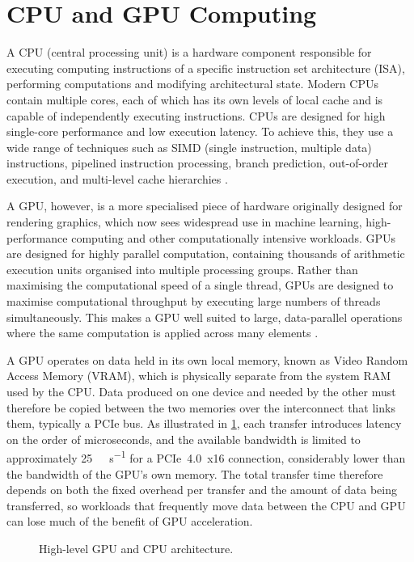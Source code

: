 \section{CPU and GPU Computing}

A CPU (central processing unit) is a hardware component responsible for executing computing instructions of a 
specific instruction set architecture (ISA), performing computations and modifying architectural state. 
Modern CPUs contain multiple cores, each of which has its own levels of local cache and is capable of independently 
executing instructions. CPUs are designed for high single-core performance and low execution latency. 
To achieve this, they use a wide range of techniques such as SIMD (single instruction, multiple data) instructions, pipelined instruction processing, 
branch prediction, out-of-order execution, and multi-level cache hierarchies \parencite{stokesMachine2006}.

A GPU, however, is a more specialised piece of hardware originally designed for rendering graphics, 
which now sees widespread use in machine learning, high-performance computing and other computationally intensive workloads. 
GPUs are designed for highly parallel computation, containing thousands of arithmetic execution units organised into multiple 
processing groups. Rather than maximising the computational speed of a single thread, GPUs are designed to maximise 
computational throughput by executing large numbers of threads simultaneously. This makes a GPU well suited to large, 
data-parallel operations where the same computation is applied across many elements \parencite{nickollsGPUComputingEra2010}.

A GPU operates on data held in its own local memory, known as Video Random Access Memory (VRAM), which is 
physically separate from the system RAM used by the CPU. Data produced on one device and needed by the other must 
therefore be copied between the two memories over the interconnect that links them, typically a PCIe bus. 
As illustrated in \cref{fig:gpu-cpu-architecture}, each transfer introduces latency on the order of microseconds, 
and the available bandwidth is limited to approximately \qty{25}{\giga\byte\per\second} for a PCIe~4.0~x16 connection, 
considerably lower than the bandwidth of the GPU's own memory. The total transfer time therefore depends on both 
the fixed overhead per transfer and the amount of data being transferred, so workloads that frequently move data 
between the CPU and GPU can lose much of the benefit of GPU acceleration.

\begin{figure}
  \centering
  \caption{High-level GPU and CPU architecture.}
  \label{fig:gpu-cpu-architecture}
\end{figure}
